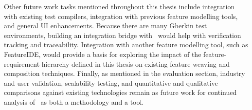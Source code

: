 Other future work tasks mentioned throughout this thesis include integration with existing test compilers, integration with previous feature modelling tools, and general UI enhancements. Because there are many Gherkin test environments, building an integration bridge with \tool\ would help with verification tracking and traceability. Integration with another feature modelling tool, such as FeatureIDE, would provide a basis for exploring the impact of the feature-requirement hierarchy defined in this thesis on existing feature weaving and composition techniques. Finally, as mentioned in the evaluation section, industry and user validation, scalability testing, and quantitative and qualitative comparisons against existing technologies remain as future work for continued analysis of \tool\ as both a methodology and a tool.


